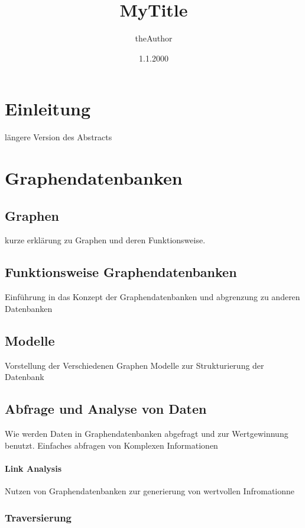 \documentclass[a4paper,12pt,headsepline]{report}
\title{MyTitle}
\author{theAuthor}
\date{1.1.2000}
\begin{document}

 
 
 
 
 
\tableofcontents %

\pagestyle{plain} %

\chapter{Einleitung}
längere Version des Abstracts 


\chapter{Graphendatenbanken}
\section{Graphen}
kurze erklärung zu Graphen und deren Funktionsweise.
\section{Funktionsweise Graphendatenbanken}
Einführung in das Konzept der Graphendatenbanken
und abgrenzung zu anderen Datenbanken
\section{Modelle}
Vorstellung der Verschiedenen Graphen Modelle zur Strukturierung der Datenbank
\section{Abfrage und Analyse von Daten}
Wie werden Daten in Graphendatenbanken abgefragt und zur Wertgewinnung benutzt.
Einfaches abfragen von Komplexen Informationen
\subsubsection{Link Analysis}
Nutzen von Graphendatenbanken zur generierung von wertvollen Infromationne
\subsection{Traversierung}
\end{document}
